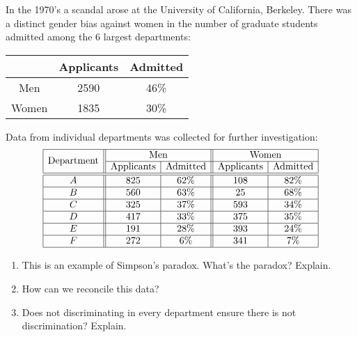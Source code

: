\documentclass[nooutcomes,noauthor,hints,handout]{ximera}
\begin{document}
\begin{question}
In the 1970's a scandal arose at the University of California,
Berkeley. There was a distinct gender bias against women in the number
of graduate students admitted among the 6 largest departments:
\begin{center}
\begin{tabular}{|c||c|c|} \hline
 & Applicants & Admitted \\ \hline\hline
Men & 2590 & 46\% \\ \hline
Women & 1835 & 30\% \\ \hline
\end{tabular}
\end{center}
Data from individual departments was collected for further investigation:
\[
\begin{array}{|c||c|c||c|c|} \hline
\multirow{2}{*}{\text{Department}} & \multicolumn{2}{c||}{\text{Men}} & \multicolumn{2}{c|}{\text{Women}}  \\\cline{2-5}
 & \text{Applicants} & \text{Admitted} & \text{Applicants} & \text{Admitted} \\\hline\hline
A & 825 & 62\% & 108 & 82\%\\ \hline
B & 560 & 63\% & 25 & 68\% \\ \hline
C & 325 & 37\% & 593 & 34\% \\ \hline
D & 417 & 33\% & 375 & 35\% \\ \hline
E & 191 & 28\% & 393 & 24\% \\ \hline
F & 272 & 6\% & 341 & 7\% \\ \hline
\end{array}
\]

\begin{enumerate}
\item This is an example of Simpson's paradox. What's the paradox? Explain.
\item How can we reconcile this data?
\item Does not discriminating in every department ensure there is not discrimination? Explain.
\end{enumerate}

\end{question}
\end{document}
